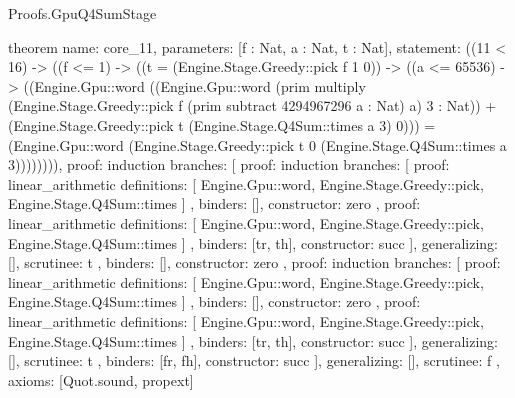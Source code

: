 \begin{lexlean}{Proofs.GpuQ4SumStage}
\begin{semanticmodule}
theorem{
  name: core_11,
  parameters: [f : Nat, a : Nat, t : Nat],
  statement: ((11 < 16) -> ((f <= 1) -> ((t = (Engine.Stage.Greedy::pick f 1 0)) -> ((a <= 65536) -> ((Engine.Gpu::word ((Engine.Gpu::word (prim multiply (Engine.Stage.Greedy::pick f (prim subtract 4294967296 a : Nat) a) 3 : Nat)) + (Engine.Stage.Greedy::pick t (Engine.Stage.Q4Sum::times a 3) 0))) = (Engine.Gpu::word (Engine.Stage.Greedy::pick t 0 (Engine.Stage.Q4Sum::times a 3)))))))),
  proof: induction{
    branches: [
      {
        proof: induction{
          branches: [
            {
              proof: linear_arithmetic{
                definitions: [
                  Engine.Gpu::word,
                  Engine.Stage.Greedy::pick,
                  Engine.Stage.Q4Sum::times
                ]
              },
              binders: [],
              constructor: zero
            },
            {
              proof: linear_arithmetic{
                definitions: [
                  Engine.Gpu::word,
                  Engine.Stage.Greedy::pick,
                  Engine.Stage.Q4Sum::times
                ]
              },
              binders: [tr, th],
              constructor: succ
            }
          ],
          generalizing: [],
          scrutinee: t
        },
        binders: [],
        constructor: zero
      },
      {
        proof: induction{
          branches: [
            {
              proof: linear_arithmetic{
                definitions: [
                  Engine.Gpu::word,
                  Engine.Stage.Greedy::pick,
                  Engine.Stage.Q4Sum::times
                ]
              },
              binders: [],
              constructor: zero
            },
            {
              proof: linear_arithmetic{
                definitions: [
                  Engine.Gpu::word,
                  Engine.Stage.Greedy::pick,
                  Engine.Stage.Q4Sum::times
                ]
              },
              binders: [tr, th],
              constructor: succ
            }
          ],
          generalizing: [],
          scrutinee: t
        },
        binders: [fr, fh],
        constructor: succ
      }
    ],
    generalizing: [],
    scrutinee: f
  },
  axioms: [Quot.sound, propext]
}


\end{semanticmodule}
\end{lexlean}
